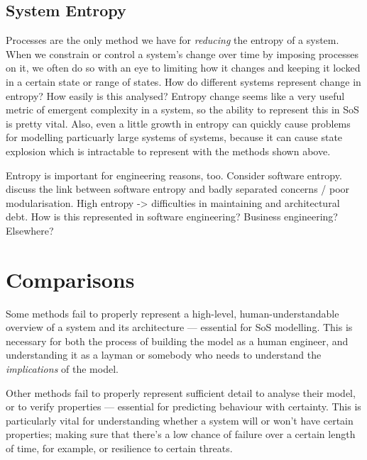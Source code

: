 \subsection{System Entropy}
Processes are the only method we have for \emph{reducing} the entropy of a system.
When we constrain or control a system's change over time by imposing processes on it, we often do so with an eye to limiting how it changes and keeping it locked in a certain state or range of states.
How do different systems represent change in entropy? How easily is this analysed?
Entropy change seems like a very useful metric of emergent complexity in a system, so the ability to represent this in SoS is pretty vital.
Also, even a little growth in entropy can quickly cause problems for modelling particuarly large systems of systems, because it can cause state explosion which is intractable to represent with the methods shown above.  
\par

Entropy is important for engineering reasons, too. Consider software entropy.
discuss the link between software entropy and badly separated concerns / poor modularisation.
High entropy -> difficulties in maintaining and architectural debt.
How is this represented in software engineering? Business engineering? Elsewhere?
\par


  

\section{Comparisons}

Some methods fail to properly represent a high-level, human-understandable overview of a system and its architecture --- essential for SoS modelling.
This is necessary for both the process of building the model as a human engineer, and understanding it as a layman or somebody who needs to understand the \emph{implications} of the model.
\par

Other methods fail to properly represent sufficient detail to analyse their model, or to verify properties --- essential for predicting behaviour with certainty.
This is particularly vital for understanding whether a system will or won't have certain properties; making sure that there's a low chance of failure over a certain length of time, for example, or resilience to certain threats.
\par
